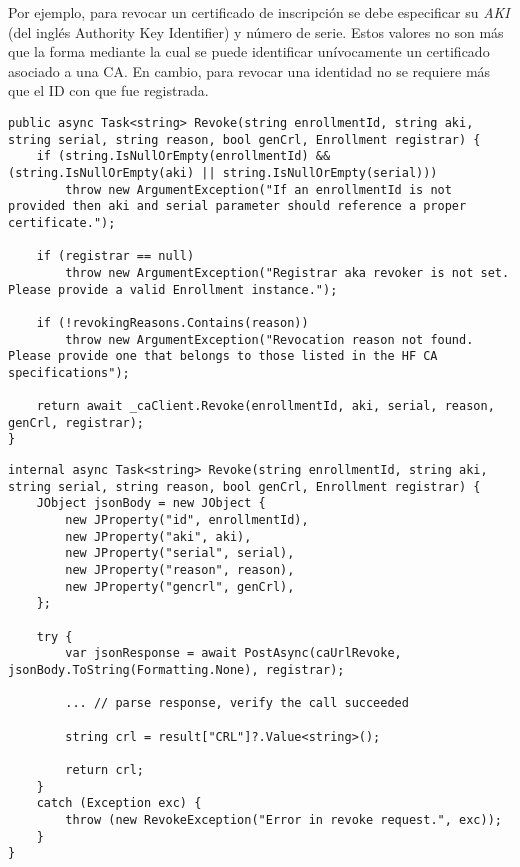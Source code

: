 Por ejemplo, para revocar un certificado de inscripción se debe especificar su \emph{AKI} (del ingl\'es Authority Key Identifier) y número de serie. Estos valores no son m\'as que la forma mediante la cual se puede identificar un\'ivocamente un certificado asociado a una CA. En cambio, para revocar una identidad no se requiere m\'as que el ID con que fue registrada.


\begin{lstlisting}[caption={M\'etodo \texttt{Revoke} de la clase \texttt{CAService}.}, label={code:revCaService}]
public async Task<string> Revoke(string enrollmentId, string aki, string serial, string reason, bool genCrl, Enrollment registrar) {
	if (string.IsNullOrEmpty(enrollmentId) && (string.IsNullOrEmpty(aki) || string.IsNullOrEmpty(serial)))
		throw new ArgumentException("If an enrollmentId is not provided then aki and serial parameter should reference a proper certificate.");
	
	if (registrar == null)
		throw new ArgumentException("Registrar aka revoker is not set. Please provide a valid Enrollment instance.");
	
	if (!revokingReasons.Contains(reason))
		throw new ArgumentException("Revocation reason not found. Please provide one that belongs to those listed in the HF CA specifications");
	
	return await _caClient.Revoke(enrollmentId, aki, serial, reason, genCrl, registrar);
}
\end{lstlisting}


\begin{lstlisting}[caption={M\'etodo \texttt{Revoke} de la clase \texttt{CAClient}.}, label={code:revCaClient}]
internal async Task<string> Revoke(string enrollmentId, string aki, string serial, string reason, bool genCrl, Enrollment registrar) {
	JObject jsonBody = new JObject {
		new JProperty("id", enrollmentId),
		new JProperty("aki", aki),
		new JProperty("serial", serial),
		new JProperty("reason", reason),
		new JProperty("gencrl", genCrl),
	};
	
	try {
		var jsonResponse = await PostAsync(caUrlRevoke, jsonBody.ToString(Formatting.None), registrar);

		... // parse response, verify the call succeeded
	
		string crl = result["CRL"]?.Value<string>();

		return crl;
	}
	catch (Exception exc) {
		throw (new RevokeException("Error in revoke request.", exc));
	}
}
\end{lstlisting}

